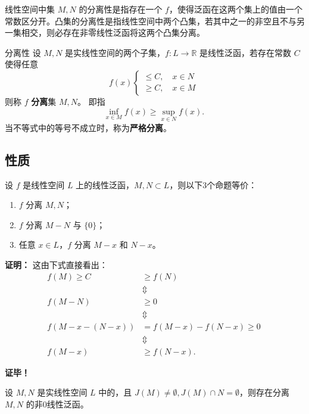 

线性空间中集 $M,N$ 的分离性是指存在一个 $f$，使得泛函在这两个集上的值由一个常数区分开。凸集的分离性是指线性空间中两个凸集，若其中之一的非空且不与另一集相交，则必存在非零线性泛函将这两个凸集分离。

\begin{definition}{分离性}
设 $M,N$ 是实线性空间的两个子集，$f:L\rightarrow\mathbb R$ 是线性泛函，若存在常数 $C$ 使得任意 
\begin{equation}
f(x)\left\{\begin{aligned}\leq C,\quad x\in N\\
\geq C,\quad x\in M
\end{aligned}\right.~
\end{equation}
则称 $f$ \textbf{分离}集 $M,N$。
即指
\begin{equation}
\inf_{x\in M}f(x)\geq\sup_{x\in N}f(x).~
\end{equation}
当不等式中的等号不成立时，称为\textbf{严格分离}。
\end{definition}
\subsection{性质}
\begin{theorem}{}
设 $f$ 是线性空间 $L$ 上的线性泛函，$M,N\subset L$，则以下3个命题等价：
\begin{enumerate}
\item $f$ 分离 $M,N$；
\item $f$ 分离 $M-N$ 与 $\{0\}$；
\item 任意 $x\in L$，$f$ 分离 $M-x$ 和 $N-x$。
\end{enumerate}
\end{theorem}
\textbf{证明：}
这由下式直接看出：
\begin{equation}
\begin{aligned}
f(M)\geq C&\geq f(N)\\
&\Updownarrow \\
f(M-N)&\geq0\\
&\Updownarrow \\
f(M-x-(N-x))&=f(M-x)-f(N-x)\geq0\\
&\Updownarrow\\
f(M-x)&\geq f(N-x).
\end{aligned}~ 
\end{equation}


\textbf{证毕！}


\begin{theorem}{}
设 $M,N$ 是实线性空间 $L$ 中的，且 $J(M)\neq\emptyset,J(M)\cap N=\emptyset$，则存在分离 $M,N$ 的非0线性泛函。
\end{theorem}



